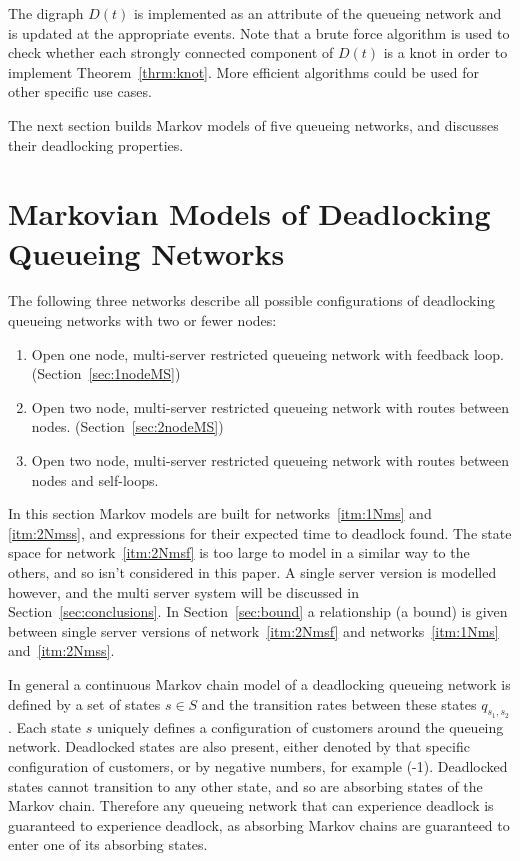 \documentclass{article}
\numberwithin{equation}{section}
\begin{document}
The digraph \(D(t)\) is implemented as an attribute of the queueing network
and is updated at the appropriate events.
Note that a brute force algorithm is used to check whether each strongly
connected component of $D(t)$ is a knot in order to implement
Theorem~\ref{thrm:knot}.
More efficient algorithms could be used for other specific use cases.

The next section builds Markov models of five queueing networks, and discusses
their deadlocking properties.


\section{Markovian Models of Deadlocking Queueing Networks}\label{sec:markovmodels}

The following three networks describe all possible configurations of 
deadlocking queueing networks with two or fewer nodes:

\begin{enumerate}
  \item Open one node, multi-server restricted queueing network with feedback
  loop. (Section~\ref{sec:1nodeMS}) \label{itm:1Nms}
  \item Open two node, multi-server restricted queueing network with routes
  between nodes. (Section~\ref{sec:2nodeMS}) \label{itm:2Nmss}
  \item Open two node, multi-server restricted queueing network with routes
  between nodes and self-loops. \label{itm:2Nmsf}
\end{enumerate}

In this section Markov models are built for networks~\ref{itm:1Nms} and
\ref{itm:2Nmss}, and expressions for their expected time to deadlock found.
The state space for network~\ref{itm:2Nmsf} is too large to model in a similar
way to the others, and so isn't considered in this paper.
A single server version is modelled however, and the multi server system will
be discussed in Section~\ref{sec:conclusions}.
In Section~\ref{sec:bound} a relationship (a bound) is given between single
server versions of network~\ref{itm:2Nmsf} and networks~\ref{itm:1Nms}
and~\ref{itm:2Nmss}.

In general a continuous Markov chain model of a deadlocking queueing network
is defined by a set of states $s \in S$ and the transition rates between these
states $q_{s_1,s_2}$.
Each state $s$ uniquely defines a configuration of customers around the
queueing network.
Deadlocked states are also present, either denoted by that specific
configuration of customers, or by negative numbers, for example (-1).
Deadlocked states cannot transition to any other state, and so are absorbing
states of the Markov chain.
Therefore any queueing network that can experience deadlock is guaranteed to
experience deadlock, as absorbing Markov chains are guaranteed to enter one of
its absorbing states.
\end{document}
